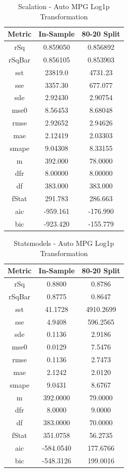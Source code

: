\documentclass{article}
\begin{document}
\begin{table}[H]
\centering
\caption{Scalation - Auto MPG Log1p Transformation}
\label{tab:Scalation - Auto MPG Log1p Transformation}
\begin{tabular}{|c|c|c|} \hline 
Metric & In-Sample & 80-20 Split \\ \hline \hline 
rSq &0.859050 & 0.856892 \\ \hline 
rSqBar &0.856105 &      0.853903 \\ \hline 
sst &23819.0 &  4731.23 \\ \hline 
sse &3357.30 &  677.077 \\ \hline 
sde &2.92430 &  2.90754 \\ \hline 
mse0 &8.56453 & 8.68048 \\ \hline 
rmse &2.92652 & 2.94626 \\ \hline 
mae &2.12419 &  2.03303 \\ \hline 
smape &9.04308 &        8.33155 \\ \hline 
m &392.000 &    78.0000 \\ \hline 
dfr &8.00000 &  8.00000 \\ \hline 
df &383.000 &   383.000 \\ \hline 
fStat &291.783 &        286.663 \\ \hline 
aic &-959.161 & -176.990 \\ \hline 
bic &-923.420 & -155.779 \\ \hline 
\end{tabular}
\end{table}

\begin{table}[H]
\centering
\caption{Statsmodels - Auto MPG Log1p Transformation}
\label{tab:Statsmodels - Auto MPG Log1p Transformation}
\begin{tabular}{|c|c|c|}\hline
Metric & In-Sample & 80-20 Split \\ \hline \hline
rSq & 0.8800 & 0.8786 \\ \hline
rSqBar & 0.8775 & 0.8647 \\ \hline
sst & 41.1728 & 4910.2699 \\ \hline
sse & 4.9408 & 596.2565 \\ \hline
sde & 0.1136 & 2.9186 \\ \hline
mse0 & 0.0129 & 7.5476 \\ \hline
rmse & 0.1136 & 2.7473 \\ \hline
mae & 2.1242 & 2.0120 \\ \hline
smape & 9.0431 & 8.6767 \\ \hline
m & 392.0000 & 79.0000 \\ \hline
dfr & 8.0000 & 9.0000 \\ \hline
df & 383.0000 & 70.0000 \\ \hline
fStat & 351.0758 & 56.2735 \\ \hline
aic & -584.0540 & 177.6766 \\ \hline
bic & -548.3126 & 199.0016 \\ \hline
\end{tabular}
\end{table}
\end{document}

